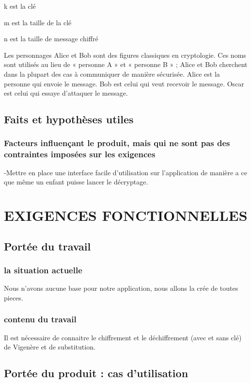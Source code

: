 \documentclass[a4]{article}
\begin{document}
			k est la clé

			m est la taille de la clé

			n est la taille de message chiffré
			
			Les personnages Alice et Bob sont des figures classiques en cryptologie. Ces noms sont utilisés au lieu de « personne A » et « personne B » ; Alice et Bob cherchent dans la plupart des cas à communiquer de manière sécurisée.
			Alice est la personne qui envoie le message.
			Bob est celui qui veut recevoir le message.
			Oscar est celui qui essaye d'attaquer le message.
		\subsection{Faits et hypothèses utiles}	
			\subsubsection{Facteurs influençant le produit, mais qui ne sont pas des contraintes imposées sur les exigences}
	
				-Mettre en place une interface facile d'utilisation sur l'application de manière a ce que même un enfant puisse lancer le décryptage.
	\section{EXIGENCES FONCTIONNELLES}
		\subsection{Portée du travail}
			\subsubsection{la situation actuelle}
				Nous n'avons aucune base pour notre application, nous allons la crée de toutes pieces.
			\subsubsection{contenu du travail}
				Il est nécessaire de connaitre le chiffrement et le déchiffrement (avec et sans clé) de Vigenère et de substitution.
		\subsection{Portée du produit : cas d’utilisation}
\end{document}
